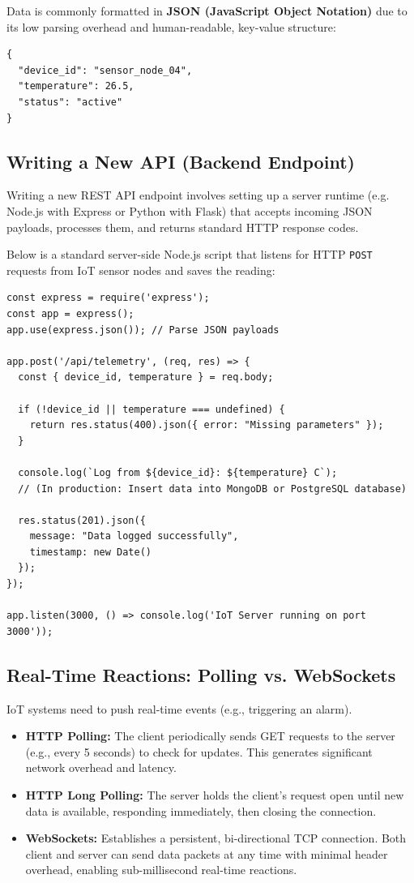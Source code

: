 \documentclass[12pt,a4paper]{article}
\begin{document}
Data is commonly formatted in \textbf{JSON (JavaScript Object Notation)} due to its low parsing overhead and human-readable, key-value structure:
\begin{verbatim}
{
  "device_id": "sensor_node_04",
  "temperature": 26.5,
  "status": "active"
}
\end{verbatim}
\subsection{Writing a New API (Backend Endpoint)}
Writing a new REST API endpoint involves setting up a server runtime (e.g. Node.js with Express or Python with Flask) that accepts incoming JSON payloads, processes them, and returns standard HTTP response codes.
\begin{tcolorbox}[examplebox, title={Express.js IoT Server-Side Logging API}]
  Below is a standard server-side Node.js script that listens for HTTP \texttt{POST} requests from IoT sensor nodes and saves the reading:
\begin{verbatim}
const express = require('express');
const app = express();
app.use(express.json()); // Parse JSON payloads

app.post('/api/telemetry', (req, res) => {
  const { device_id, temperature } = req.body;
  
  if (!device_id || temperature === undefined) {
    return res.status(400).json({ error: "Missing parameters" });
  }
  
  console.log(`Log from ${device_id}: ${temperature} C`);
  // (In production: Insert data into MongoDB or PostgreSQL database)
  
  res.status(201).json({ 
    message: "Data logged successfully", 
    timestamp: new Date() 
  });
});

app.listen(3000, () => console.log('IoT Server running on port 3000'));
\end{verbatim}
\end{tcolorbox}
\subsection{Real-Time Reactions: Polling vs. WebSockets}
IoT systems need to push real-time events (e.g., triggering an alarm).
\begin{itemize}[leftmargin=*, itemsep=3.5pt]
  \item \textbf{HTTP Polling:} The client periodically sends GET requests to the server (e.g., every 5 seconds) to check for updates. This generates significant network overhead and latency.
  \item \textbf{HTTP Long Polling:} The server holds the client's request open until new data is available, responding immediately, then closing the connection.
  \item \textbf{WebSockets:} Establishes a persistent, bi-directional TCP connection. Both client and server can send data packets at any time with minimal header overhead, enabling sub-millisecond real-time reactions.
\end{itemize}
\end{document}
